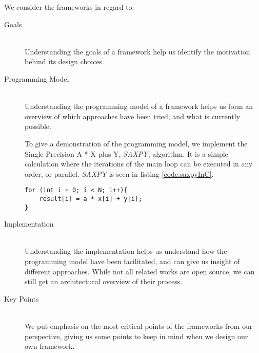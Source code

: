 We consider the frameworks in regard to:
\begin{description}
\item[Goals] \hfill \\
Understanding the goals of a framework help us identify the motivation behind its design choices.

\item[Programming Model] \hfill \\
Understanding the programming model of a framework helps us form an overview of which approaches have been tried, and what is currently possible. 

To give a demonstration of the programming model, we implement the Single-Precision A * X plus Y, \textit{SAXPY}, algorithm. It is a simple calculation where the iterations of the main loop can be executed in any order, or parallel. \textit{SAXPY} is seen in listing \ref{code:saxpyInC}.
\begin{lstlisting}[caption={The \textit{SAXPY} computation in C.}, label=code:saxpyInC] 
for (int i = 0; i < N; i++){
    result[i] = a * x[i] + y[i];
}
\end{lstlisting}

\item[Implementation] \hfill \\
Understanding the implementation helps us understand how the programming model have been facilitated, and can give us insight of different approaches. While not all related works are open source, we can still get an architectural overview of their process.

\item[Key Points] \hfill \\
We put emphasis on the most critical points of the frameworks from our perspective, giving us some points to keep in mind when we design our own framework.
\end{description}